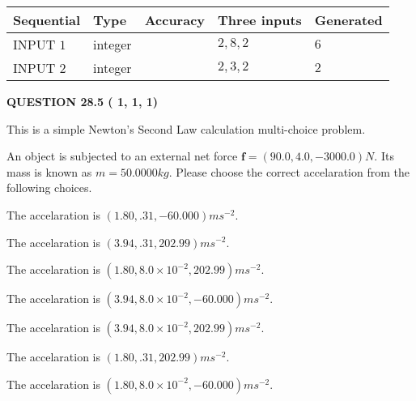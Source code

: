 \documentclass[12pt]{article}
\begin{document}
   
  
  
\noindent\begin{tabular}{|l|l|l|l|l|}
\hline
 Sequential & Type & Accuracy & Three inputs & Generated \\ 
\hline
 
 
  INPUT $           1$ & integer &  & $
 2
 , 
 8
 , 
 2
 $ & $ 6 $ 
 \\  \hline  
 
 
  INPUT $           2$ & integer &  & $
 2
 , 
 3
 , 
 2
 $ & $ 2 $ 
 \\  \hline  
 \end{tabular}
   
   
  
\vspace{0.2in}
  
{\textbf{\Large{QUESTION
28.5 
 (          1,          1,          1)
}}}
  
  


\noindent{}
This is a simple Newton's Second Law calculation multi-choice problem.  
\noindent{}


 
 
An object is subjected to an external net force $\mathbf{f}=
(90.0 , 4.0 , -3000.0) N$.
Its mass is known as $m= %
50.0000 kg$. Please choose the
correct accelaration from the following choices.
 
 
 
The accelaration is $  %
(
1.80,
.31,
-60.000)
ms^{-2} $.
 
 
The accelaration is $  %
(
3.94,
.31,
202.99)
ms^{-2} $.
 
 
The accelaration is $  %
(
1.80,
8.0 \times 10^{-2},
202.99)
ms^{-2} $.
 
 
The accelaration is $  %
(
3.94,
8.0 \times 10^{-2},
-60.000)
ms^{-2} $.
 
 
The accelaration is $  %
(
3.94,
8.0 \times 10^{-2},
202.99)
ms^{-2} $.
 
 
The accelaration is $  %
(
1.80,
.31,
202.99)
ms^{-2} $.
 
 
The accelaration is $  %
(
1.80,
8.0 \times 10^{-2},
-60.000)
ms^{-2} $.
 
\end{document}
